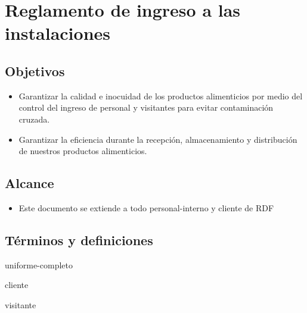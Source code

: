\thispagestyle{formato-PI}
\renewcommand{\MayorVer}{2}
\renewcommand{\MenorVer}{0}
\renewcommand{\Codigo}{BPD-4-CI/CE}
\renewcommand{\FechaPub}{2023--01}
\renewcommand{\Titulo}{Reglamento de ingreso a las instalaciones}

\section{\Titulo}

\subsection{Objetivos}
\begin{itemize}
	\item Garantizar la calidad e inocuidad de los productos alimenticios por medio del control del ingreso de personal y visitantes para evitar contaminación cruzada.
	\item Garantizar la eficiencia durante la recepción, almacenamiento y distribución de nuestros productos alimenticios.
\end{itemize}

\noindent
\subsection{Alcance}
\begin{itemize}	
	\item Este documento se extiende a todo \gls{personal-interno} y \gls{cliente} de \gls{RDF}
\end{itemize}

\subsection{Términos y definiciones}

\begin{description}
	\item[\gls{uniforme-completo}] \glsdesc{uniforme-completo}
	\item[\gls{cliente}] \glsdesc{cliente}
	\item[\gls{visitante}] \glsdesc{visitante}  
\end{description}

